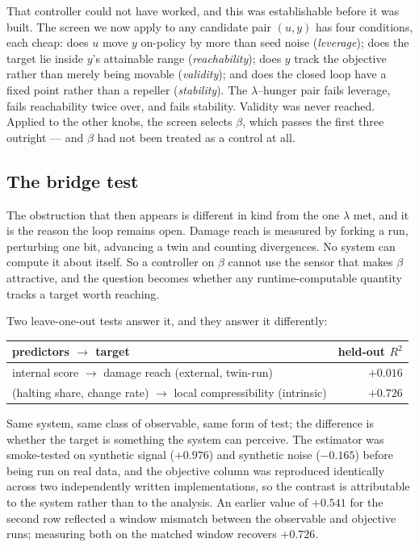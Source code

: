 \documentclass[man,12pt,floatsintext,donotrepeattitle]{apa7}
\begin{document}
That controller could not have worked, and this was establishable before it was
built. The screen we now apply to any candidate pair $(u, y)$ has four
conditions, each cheap: does $u$ move $y$ on-policy by more than seed noise
(\emph{leverage}); does the target lie inside $y$'s attainable range
(\emph{reachability}); does $y$ track the objective rather than merely being
movable (\emph{validity}); and does the closed loop have a fixed point rather
than a repeller (\emph{stability}). The $\lambda$--hunger pair fails leverage,
fails reachability twice over, and fails stability. Validity was never reached.
Applied to the other knobs, the screen selects $\beta$, which passes the first
three outright --- and $\beta$ had not been treated as a control at all.

\subsection*{The bridge test}

The obstruction that then appears is different in kind from the one $\lambda$
met, and it is the reason the loop remains open. Damage reach is measured by
forking a run, perturbing one bit, advancing a twin and counting divergences. No
system can compute it about itself. So a controller on $\beta$ cannot use the
sensor that makes $\beta$ attractive, and the question becomes whether any
runtime-computable quantity tracks a target worth reaching.

Two leave-one-out tests answer it, and they answer it differently:

\begin{center}
\begin{tabular}{lr}
\toprule
predictors $\to$ target & held-out $R^2$ \\
\midrule
internal score $\to$ damage reach (external, twin-run) & $+0.016$ \\
(halting share, change rate) $\to$ local compressibility (intrinsic) & $+0.726$ \\
\bottomrule
\end{tabular}
\end{center}

Same system, same class of observable, same form of test; the difference is
whether the target is something the system can perceive. The estimator was
smoke-tested on synthetic signal ($+0.976$) and synthetic noise ($-0.165$)
before being run on real data, and the objective column was reproduced
identically across two independently written implementations, so the contrast is
attributable to the system rather than to the analysis. An earlier value of
$+0.541$ for the second row reflected a window mismatch between the observable
and objective runs; measuring both on the matched window recovers $+0.726$.
\end{document}
